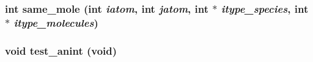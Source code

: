\subsubsection{\setlength{\rightskip}{0pt plus 5cm}int same\_\-mole (int {\em iatom}, int {\em jatom}, int $\ast$ {\em itype\_\-species}, int $\ast$ {\em itype\_\-molecules})}\label{md__util_8c_e3d0df6067ab8da08e90f66ab8c2c417}


\subsubsection{\setlength{\rightskip}{0pt plus 5cm}void test\_\-anint (void)}\label{md__util_8c_f2bb2600d7dd8b340ea72276e8fbe30b}



